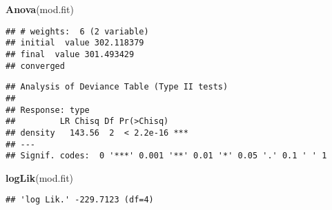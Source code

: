 \documentclass[]{article}
\newenvironment{Shaded}{\begin{snugshade}}{\end{snugshade}}
\newcommand{\KeywordTok}[1]{\textcolor[rgb]{0.13,0.29,0.53}{\textbf{#1}}}
\newcommand{\NormalTok}[1]{#1}
\begin{document}
\begin{Shaded}
\begin{Highlighting}[]
\KeywordTok{Anova}\NormalTok{(mod.fit)}
\end{Highlighting}
\end{Shaded}

\begin{verbatim}
## # weights:  6 (2 variable)
## initial  value 302.118379 
## final  value 301.493429 
## converged
\end{verbatim}

\begin{verbatim}
## Analysis of Deviance Table (Type II tests)
## 
## Response: type
##         LR Chisq Df Pr(>Chisq)    
## density   143.56  2  < 2.2e-16 ***
## ---
## Signif. codes:  0 '***' 0.001 '**' 0.01 '*' 0.05 '.' 0.1 ' ' 1
\end{verbatim}

\begin{Shaded}
\begin{Highlighting}[]
\KeywordTok{logLik}\NormalTok{(mod.fit)}
\end{Highlighting}
\end{Shaded}

\begin{verbatim}
## 'log Lik.' -229.7123 (df=4)
\end{verbatim}
\end{document}
